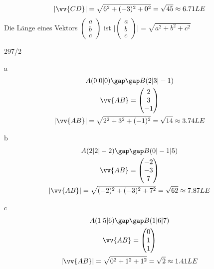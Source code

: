 \begin{gather*}
  |\vv{CD}| = \sqrt{6^2 + (-3)^2 + 0^2} = \sqrt{45} \approx 6.71LE
\end{gather*}
Die Länge eines Vektors $\begin{pmatrix}a \\ b \\ c\end{pmatrix}$ ist $\Biggl|\begin{pmatrix}a \\ b \\ c\end{pmatrix}\Biggl| = \sqrt{a^2 + b^2 + c^2}$
\begin{exercise}{297/2}
  \item [a]
  \begin{gather*}
    A(0|0|0) \gap\gap B(2|3|-1) \\
    \vv{AB} = \begin{pmatrix}2 \\ 3 \\ -1\end{pmatrix} \\
    |\vv{AB}| = \sqrt{2^2 + 3^2 + (-1)^2} = \sqrt{14} \approx 3.74LE
  \end{gather*}
  \item [b]
  \begin{gather*}
    A(2|2|-2) \gap\gap B(0|-1|5) \\
    \vv{AB} = \begin{pmatrix}-2 \\ -3 \\ 7\end{pmatrix} \\
    |\vv{AB}| = \sqrt{(-2)^2 + (-3)^2 + 7^2} = \sqrt{62} \approx 7.87LE
  \end{gather*}
  \item [c]
  \begin{gather*}
    A(1|5|6) \gap\gap B(1|6|7) \\
    \vv{AB} = \begin{pmatrix}0 \\ 1 \\ 1\end{pmatrix} \\
    |\vv{AB}| = \sqrt{0^2 + 1^2 + 1^2} = \sqrt{2} \approx 1.41LE
  \end{gather*}
\end{exercise}
